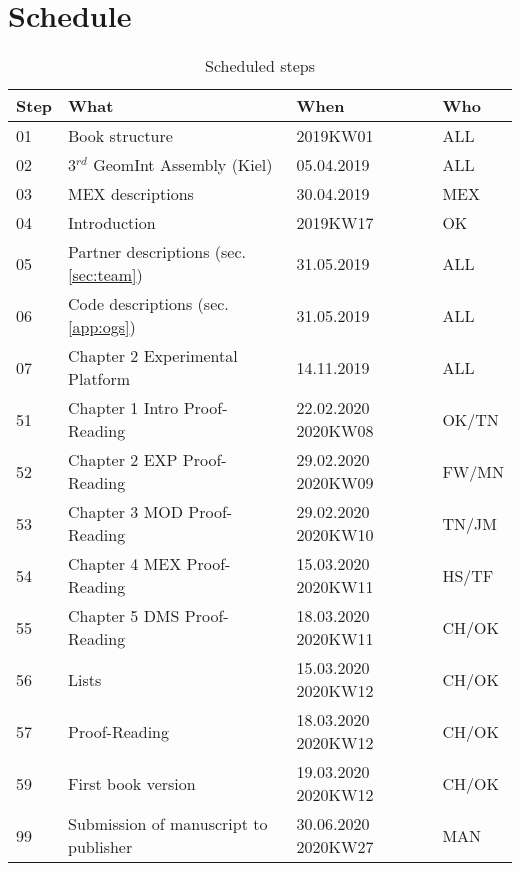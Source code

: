 \section*{Schedule}

\begin{table}[h!]
\centering
\caption{Scheduled steps}
\label{tab:schedule}
\begin{tabular}{|p{0.3in}|p{2.7in}|p{0.7in}|p{0.5in}|} \hline 
\rowcolor{gray!50}
Step & What & When & Who \\ \hline \hline
\rowcolor{green!50}
01 & Book structure & 2019KW01 & ALL \\ \hline 
\hline
02 & 3$^{rd}$ GeomInt Assembly (Kiel) & 05.04.2019 & ALL \\ \hline 
03 & MEX descriptions & 30.04.2019 & MEX \\ \hline 
04 & Introduction & 2019KW17 & OK \\ \hline 
05 & Partner descriptions (sec. \ref{sec:team}) & 31.05.2019 & ALL \\ \hline 
06 & Code descriptions (sec. \ref{app:ogs}) & 31.05.2019 & ALL \\ \hline 
07 & Chapter 2 Experimental Platform & 14.11.2019 & ALL \\ \hline 
\hline
\rowcolor{green!50}
51 & Chapter 1 Intro Proof-Reading & 22.02.2020 2020KW08 & OK/TN \\ \hline 
\rowcolor{green!50}
52 & Chapter 2 EXP Proof-Reading & 29.02.2020 2020KW09 & FW/MN \\ \hline 
\rowcolor{green!50}
53 & Chapter 3 MOD Proof-Reading & 29.02.2020 2020KW10 & TN/JM \\ \hline 
54 & Chapter 4 MEX Proof-Reading & 15.03.2020 2020KW11 & HS/TF \\ \hline 
55 & Chapter 5 DMS Proof-Reading & 18.03.2020 2020KW11 & CH/OK \\ \hline 
56 & Lists & 15.03.2020 2020KW12 & CH/OK \\ \hline 
57 & Proof-Reading & 18.03.2020 2020KW12 & CH/OK \\ \hline 
\rowcolor{red!50}
59 & First book version & 19.03.2020 2020KW12 & CH/OK \\ \hline
\hline
\rowcolor{red!50}
99 & Submission of manuscript to publisher & 30.06.2020 2020KW27 & MAN \\ \hline
\end{tabular}
\end{table}

